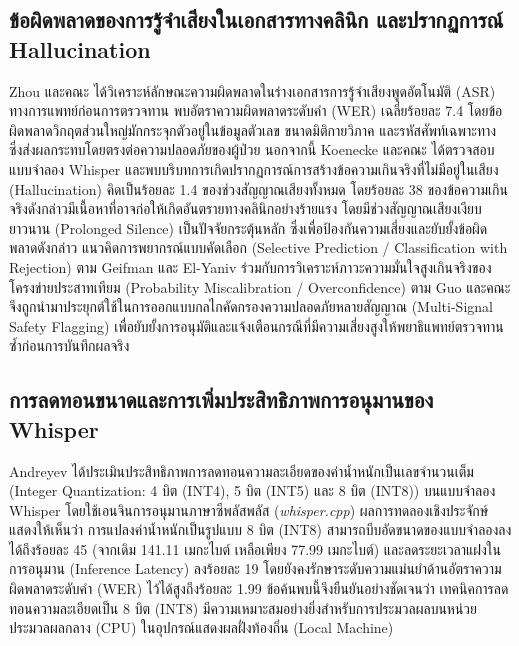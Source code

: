 \subsection{ข้อผิดพลาดของการรู้จำเสียงในเอกสารทางคลินิก และปรากฏการณ์ Hallucination}
Zhou และคณะ \cite{zhou2018errors} ได้วิเคราะห์ลักษณะความผิดพลาดในร่างเอกสารการรู้จำเสียงพูดอัตโนมัติ (ASR) ทางการแพทย์ก่อนการตรวจทาน พบอัตราความผิดพลาดระดับคำ (WER) เฉลี่ยร้อยละ 7.4 โดยข้อผิดพลาดวิกฤตส่วนใหญ่มักกระจุกตัวอยู่ในข้อมูลตัวเลข ขนาดมิติกายวิภาค และรหัสศัพท์เฉพาะทาง ซึ่งส่งผลกระทบโดยตรงต่อความปลอดภัยของผู้ป่วย นอกจากนี้ Koenecke และคณะ \cite{koenecke2024careless} ได้ตรวจสอบแบบจำลอง Whisper และพบบริบทการเกิดปรากฏการณ์การสร้างข้อความเกินจริงที่ไม่มีอยู่ในเสียง (Hallucination) คิดเป็นร้อยละ 1.4 ของช่วงสัญญาณเสียงทั้งหมด โดยร้อยละ 38 ของข้อความเกินจริงดังกล่าวมีเนื้อหาที่อาจก่อให้เกิดอันตรายทางคลินิกอย่างร้ายแรง โดยมีช่วงสัญญาณเสียงเงียบยาวนาน (Prolonged Silence) เป็นปัจจัยกระตุ้นหลัก ซึ่งเพื่อป้องกันความเสี่ยงและยับยั้งข้อผิดพลาดดังกล่าว แนวคิดการพยากรณ์แบบคัดเลือก (Selective Prediction / Classification with Rejection) ตาม Geifman และ El-Yaniv \cite{geifman2017selective} ร่วมกับการวิเคราะห์ภาวะความมั่นใจสูงเกินจริงของโครงข่ายประสาทเทียม (Probability Miscalibration / Overconfidence) ตาม Guo และคณะ \cite{guo2017calibration} จึงถูกนำมาประยุกต์ใช้ในการออกแบบกลไกคัดกรองความปลอดภัยหลายสัญญาณ (Multi-Signal Safety Flagging) เพื่อยับยั้งการอนุมัติและแจ้งเตือนกรณีที่มีความเสี่ยงสูงให้พยาธิแพทย์ตรวจทานซ้ำก่อนการบันทึกผลจริง

\subsection{การลดทอนขนาดและการเพิ่มประสิทธิภาพการอนุมานของ Whisper}
Andreyev \cite{andreyev2025quantization} ได้ประเมินประสิทธิภาพการลดทอนความละเอียดของค่าน้ำหนักเป็นเลขจำนวนเต็ม (Integer Quantization: 4 บิต (INT4), 5 บิต (INT5) และ 8 บิต (INT8)) บนแบบจำลอง Whisper โดยใช้เอนจินการอนุมานภาษาซีพลัสพลัส (\textit{whisper.cpp}) ผลการทดลองเชิงประจักษ์แสดงให้เห็นว่า การแปลงค่าน้ำหนักเป็นรูปแบบ 8 บิต (INT8) สามารถบีบอัดขนาดของแบบจำลองลงได้ถึงร้อยละ 45 (จากเดิม 141.11 เมกะไบต์ เหลือเพียง 77.99 เมกะไบต์) และลดระยะเวลาแฝงในการอนุมาน (Inference Latency) ลงร้อยละ 19 โดยยังคงรักษาระดับความแม่นยำด้านอัตราความผิดพลาดระดับคำ (WER) ไว้ได้สูงถึงร้อยละ 1.99 ข้อค้นพบนี้จึงยืนยันอย่างชัดเจนว่า เทคนิคการลดทอนความละเอียดเป็น 8 บิต (INT8) มีความเหมาะสมอย่างยิ่งสำหรับการประมวลผลบนหน่วยประมวลผลกลาง (CPU) ในอุปกรณ์แสดงผลฝั่งท้องถิ่น (Local Machine)


